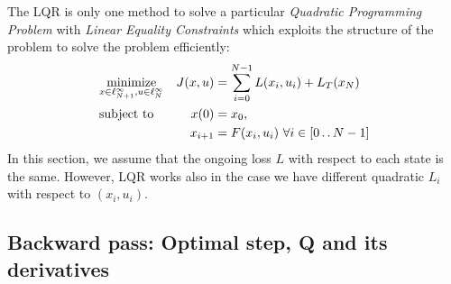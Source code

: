 \documentclass{report}
\newcommand{\twodots}{\mathinner {\ldotp \ldotp}}
\begin{document}
The LQR is only one method to solve a particular \emph{Quadratic Programming Problem} with \emph{Linear Equality Constraints} which exploits the structure of the problem to solve the problem efficiently:
\begin{equation}
\begin{aligned}
&\underset{x \in \ell_{N+1}^\infty, u \in \ell_{N}^\infty}{\text{minimize}}          &J(x, u) &=\sum_{i = 0}^{N-1} L(x_i, u_i) + L_T(x_N) \\
&\text{subject to}       &x(0)      &= x_0,  \\ %
&							      &x_{i+1}  &= F(x_i, u_i) \ \forall i \in [0 \twodots N-1]
\end{aligned}
\end{equation}
In this section, we assume that the ongoing loss $L$ with respect to each state is the same. However, LQR works also in the case we have different quadratic $L_i$ with respect to $(x_i, u_i)$.
\subsection{Backward pass: Optimal step, Q and its derivatives}
%
%
%
%
\end{document}
